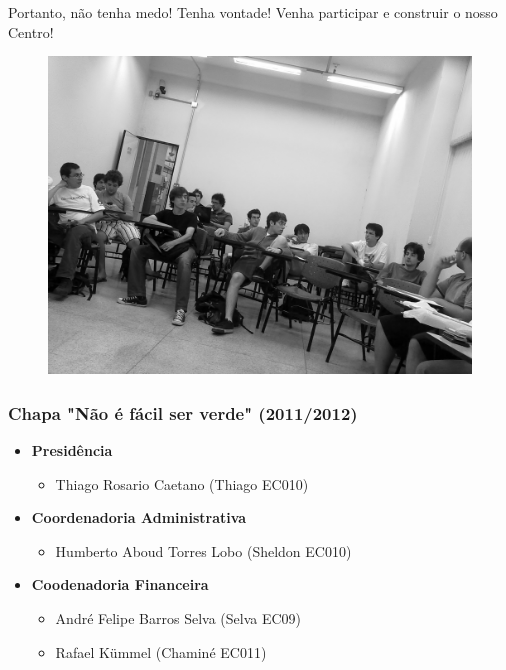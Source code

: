 Portanto, não tenha medo! Tenha vontade! Venha participar e construir o nosso
Centro!
\begin{figure}[t!]
    \centering
    \includegraphics[scale=0.47, keepaspectratio=true]{img/imgs/21-CACo/reuniao.jpg}
\end{figure}


\subsubsection{Chapa "Não é fácil ser verde" (2011/2012)}

\begin{itemize}
\item  \textbf{Presidência}
\begin{itemize}
\item Thiago Rosario Caetano (Thiago EC010)
\end{itemize}
\end{itemize}

\begin{itemize}
\item  \textbf{Coordenadoria Administrativa}
\begin{itemize}
\item Humberto Aboud Torres Lobo (Sheldon EC010) 
\end{itemize}
\end{itemize}

\begin{itemize}
\item  \textbf{Coodenadoria Financeira}
\begin{itemize}
\item  André Felipe Barros Selva (Selva EC09)
\item  Rafael Kümmel (Chaminé EC011)
\end{itemize}
\end{itemize}

